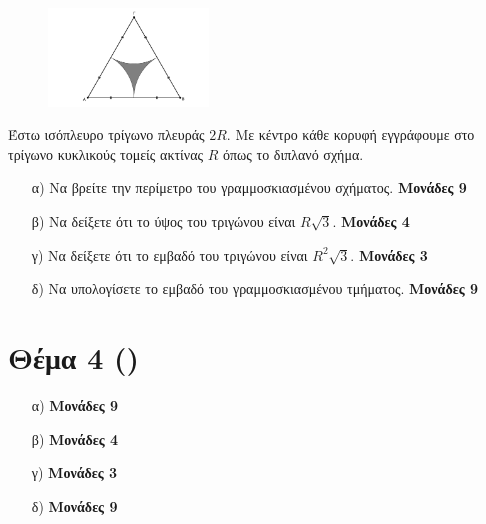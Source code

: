 \documentclass[12pt]{extarticle}
\begin{document}
\noindent

\begin{figure}
    \centering
    \vspace{-50pt}
    \hspace{-80pt}
    \includegraphics[width=0.38\textwidth]{2017BGeo3}
\end{figure}

Έστω ισόπλευρο τρίγωνο πλευράς $2R$. Με κέντρο κάθε κορυφή εγγράφουμε στο τρίγωνο κυκλικούς τομείς ακτίνας $R$ όπως το διπλανό σχήμα.
\begin{enumerate}
    \item[α)] Να βρείτε την περίμετρο του γραμμοσκιασμένου σχήματος. \hspace*{\fill} \textbf{Μονάδες 9}
    \item[β)]  Να δείξετε ότι το ύψος του τριγώνου είναι $R\sqrt{3}$. \hspace*{\fill} \textbf{Μονάδες 4}
    \item[γ)]  Να δείξετε ότι το εμβαδό του τριγώνου είναι $R^2\sqrt{3}$. \hspace*{\fill} \textbf{Μονάδες 3}
    \item[δ)]  Να υπολογίσετε το εμβαδό του γραμμοσκιασμένου τμήματος. \hspace*{\fill} \textbf{Μονάδες 9}
\end{enumerate}

\section*{Θέμα 4 ()}
\noindent


\begin{enumerate}
    \item[α)]  \hspace*{\fill} \textbf{Μονάδες 9}
    \item[β)]   \hspace*{\fill} \textbf{Μονάδες 4}
    \item[γ)]  \hspace*{\fill} \textbf{Μονάδες 3}
    \item[δ)]  \hspace*{\fill} \textbf{Μονάδες 9}
\end{enumerate}
\end{document}
